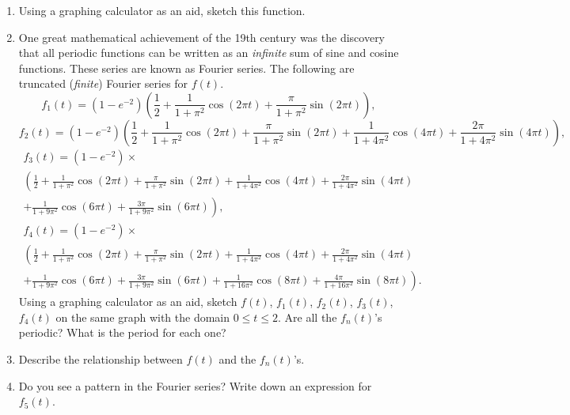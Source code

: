 \documentclass{article}
\begin{document}
\begin{enumerate}
\item Using a graphing
calculator as an aid, sketch this function.

\item One great mathematical achievement of the 19th century was the
  discovery that all periodic functions can be written as an \textit{infinite}
sum of
  sine and cosine functions.  These series are known as Fourier
  series.  The following are truncated (\textit{finite}) Fourier series for
$f(t)$.
\[
f_1(t) = \left(1-e^{-2}\right) \left(\frac{1}{2}
+ \frac{1}{1 + \pi^2}\cos(2 \pi t)  + 
\frac{\pi}{1 + \pi^2}\sin(2 \pi t)\right),
\]
\[
f_2(t) = \left(1-e^{-2}\right) \left(
\frac{1}{2} 
+ \frac{1}{1 + \pi^2}\cos(2 \pi t)  + 
\frac{\pi }{1 + \pi^2}\sin(2 \pi t) 
+ \frac{1}{1 + 4 \pi^2}\cos(4 \pi t)  + 
\frac{2 \pi}{1 + 4 \pi^2}\sin(4 \pi t)\right),
\]
\begin{multline*}
f_3(t) = \left(1-e^{-2}\right) \times \\
\left(
\frac{1}{2} 
+ \frac{1}{1 + \pi^2}\cos(2 \pi t)  + 
\frac{\pi }{1 + \pi^2}\sin(2 \pi t) 
+ \frac{1}{1 + 4 \pi^2}\cos(4 \pi t)  + 
\frac{2 \pi}{1 + 4 \pi^2}\sin(4 \pi t) \right. \\
\left. + \frac{1}{1 + 9 \pi^2}\cos(6 \pi t)  + 
\frac{3 \pi}{1 + 9 \pi^2}\sin(6 \pi t)\right),
\end{multline*}
\begin{multline*}
f_4(t) = \left(1-e^{-2}\right) \times \\
\left(
\frac{1}{2} 
+ \frac{1}{1 + \pi^2}\cos(2 \pi t)  + 
\frac{\pi }{1 + \pi^2}\sin(2 \pi t) 
+ \frac{1}{1 + 4 \pi^2}\cos(4 \pi t)  + 
\frac{2 \pi}{1 + 4 \pi^2}\sin(4 \pi t) \right. \\
\left. + \frac{1}{1 + 9 \pi^2}\cos(6 \pi t)  + 
\frac{3 \pi}{1 + 9 \pi^2}\sin(6 \pi t)
+ \frac{1}{1 + 16 \pi^2}\cos(8 \pi t)  + 
\frac{4 \pi}{1 + 16 \pi^2}\sin(8 \pi t)\right).
\end{multline*}
Using a graphing calculator as an aid, sketch $f(t)$, $f_1(t)$,
$f_2(t)$, $f_3(t)$, $f_4(t)$ on the same graph with the
domain $0 \leq t \leq 2$.  Are all the $f_n(t)$'s periodic?  What is
the period for each one?

\item Describe the relationship between $f(t)$ and the
$f_n(t)$'s.

\item Do you see a pattern in the Fourier series?  Write down an
  expression for $f_5(t)$.  


\end{enumerate}
\end{document}
